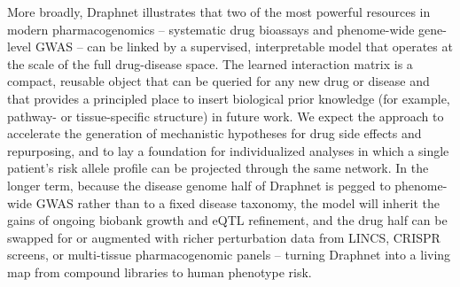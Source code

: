 \documentclass[11pt]{article}
\begin{document}
More broadly, Draphnet illustrates that two of the most powerful
resources in modern pharmacogenomics -- systematic drug bioassays and
phenome-wide gene-level GWAS -- can be linked by a supervised,
interpretable model that operates at the scale of the full drug-disease
space. The learned interaction matrix is a compact, reusable object
that can be queried for any new drug or disease and that provides a
principled place to insert biological prior knowledge (for example,
pathway- or tissue-specific structure) in future work. We expect the
approach to accelerate the generation of mechanistic hypotheses for
drug side effects and repurposing, and to lay a foundation for
individualized analyses in which a single patient's risk allele
profile can be projected through the same network. In the longer
term, because the disease genome half of Draphnet is pegged to
phenome-wide GWAS rather than to a fixed disease taxonomy, the model
will inherit the gains of ongoing biobank growth and eQTL refinement,
and the drug half can be swapped for or augmented with richer
perturbation data from LINCS, CRISPR screens, or multi-tissue
pharmacogenomic panels -- turning Draphnet into a living map from
compound libraries to human phenotype risk.



\end{document}
